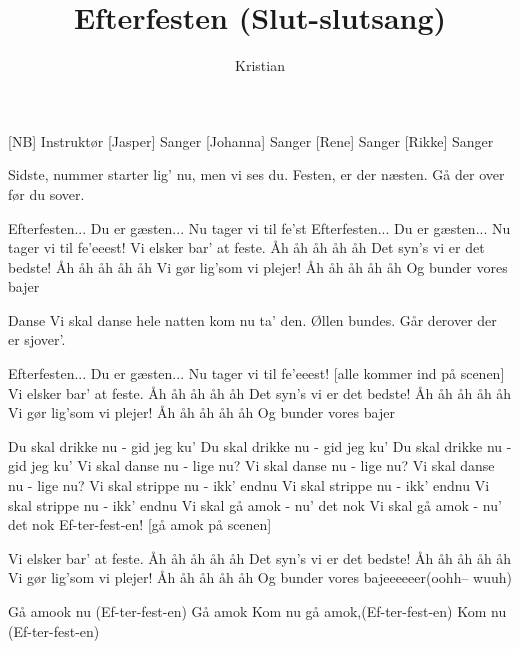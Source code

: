 \documentclass[a4paper,11pt]{article}
\title{Efterfesten (Slut-slutsang)}
\author{Kristian}
\begin{document}
\maketitle

\begin{roles}
[NB] Instruktør
[Jasper] Sanger
[Johanna] Sanger
[Rene] Sanger
[Rikke] Sanger
\end{roles}

\begin{song} 
 Sidste, nummer
starter lig' nu,
men vi ses du.
 Festen, er der næsten.
Gå der over
før du sover.

 Efterfesten...
Du er gæsten...
Nu tager vi til fe'st
 Efterfesten...
Du er gæsten...
Nu tager vi til
 fe'eeest!
Vi elsker bar' at feste. Åh åh åh åh åh
Det syn's vi er det bedste! Åh åh åh åh åh
Vi gør lig'som vi plejer! Åh åh åh åh åh
Og bunder vores bajer

Danse
Vi skal danse
hele natten
kom nu ta' den.
Øllen
bundes.
Går derover
der er sjover'.

Efterfesten...
Du er gæsten...
Nu tager vi til fe'eeest! [alle kommer ind på scenen]
Vi elsker bar' at feste. Åh åh åh åh åh
Det syn's vi er det bedste! Åh åh åh åh åh
Vi gør lig'som vi plejer! Åh åh åh åh åh
Og bunder vores bajer

 Du skal drikke nu - gid jeg ku'
Du skal drikke nu - gid jeg ku'
Du skal drikke nu - gid jeg ku'
Vi skal danse nu - lige nu?
Vi skal danse nu - lige nu?
Vi skal danse nu - lige nu?
Vi skal strippe nu - ikk' endnu
Vi skal strippe nu - ikk' endnu
Vi skal strippe nu - ikk' endnu
Vi skal gå amok - nu' det nok
Vi skal gå amok - nu' det nok
 Ef-ter-fest-en! [gå amok på scenen]

Vi elsker bar' at feste. Åh åh åh åh åh
Det syn's vi er det bedste! Åh åh åh åh åh
Vi gør lig'som vi plejer! Åh åh åh åh åh
Og bunder vores bajeeeeeer(oohh-- wuuh)

 Gå amook nu (Ef-ter-fest-en)
Gå amok
Kom nu gå amok,(Ef-ter-fest-en)
Kom nu
(Ef-ter-fest-en)

\end{song}
\end{document}
